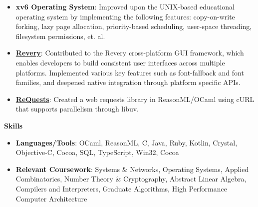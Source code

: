 \documentclass{article}
\newcommand{\sectionHeader}[1]{{\large \textbf{#1}}\hspace{5pt}\xrfill[.6ex]{.4pt}}
\newcommand{\sectionSpacer}{\vspace{6pt}}
\begin{document}
  \begin{itemize}
    \item \textbf{xv6 Operating System}: Improved upon the UNIX-based educational operating system by implementing the following features: copy-on-write forking, lazy page allocation, priority-based scheduling, user-space threading, filesystem permissions, et. al.
    \item \href{https://github.com/revery-ui/revery}{\textbf{Revery}}: Contributed to the Revery cross-platform GUI framework, which enables developers to build consistent user interfaces across multiple platforms. Implemented various key features such as font-fallback and font families, and deepened native integration through platform specific APIs.
    \item \href{https://github.com/zbaylin/ReQuests}{\textbf{ReQuests}}: Created a web requests library in ReasonML/OCaml using cURL that supports parallelism through libuv.
  \end{itemize}

  \sectionSpacer

  \sectionHeader{Skills}
  \begin{itemize}
    \item \textbf{Languages/Tools}: OCaml, ReasonML, C, Java, Ruby, Kotlin, Crystal, Objective-C, Cocoa, SQL, TypeScript, Win32, Cocoa
    \item \textbf{Relevant Coursework}: Systems \& Networks, Operating Systems, Applied Combinatorics, Number Theory \& Cryptography, Abstract Linear Algebra, Compilers and Interpreters, Graduate Algorithms, High Performance Computer Architecture 
  \end{itemize}
\end{document}
